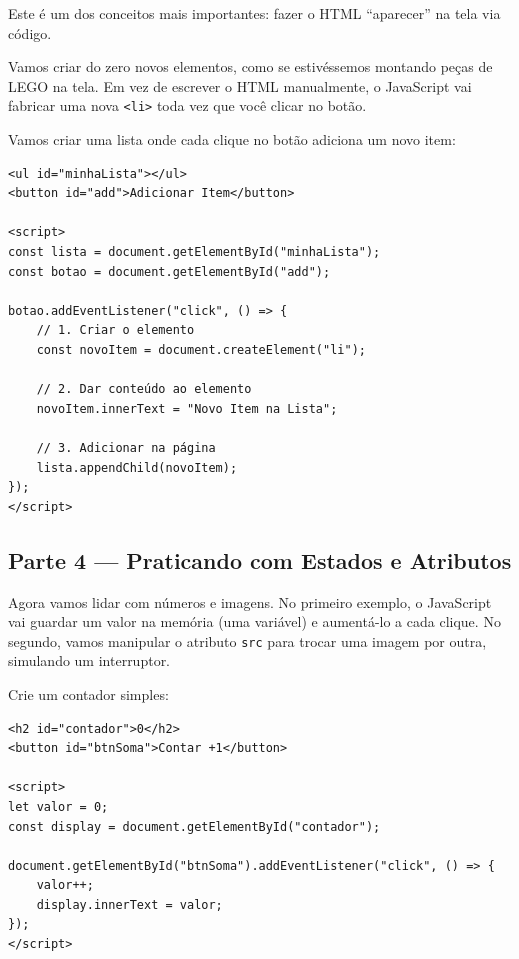 \documentclass[12pt,a4paper]{article}
\begin{document}
Este é um dos conceitos mais importantes: fazer o HTML ``aparecer'' na tela via código.

\begin{boxAtividade}
Vamos criar do zero novos elementos, como se estivéssemos montando peças de LEGO na tela. Em vez de escrever o HTML manualmente, o JavaScript vai fabricar uma nova \texttt{<li>} toda vez que você clicar no botão.
\end{boxAtividade}

\begin{boxAtividade}
Vamos criar uma lista onde cada clique no botão adiciona um novo item:

\begin{boxCodigo}
\begin{verbatim}
<ul id="minhaLista"></ul>
<button id="add">Adicionar Item</button>

<script>
const lista = document.getElementById("minhaLista");
const botao = document.getElementById("add");

botao.addEventListener("click", () => {
    // 1. Criar o elemento
    const novoItem = document.createElement("li");
    
    // 2. Dar conteúdo ao elemento
    novoItem.innerText = "Novo Item na Lista";
    
    // 3. Adicionar na página
    lista.appendChild(novoItem);
});
</script>
\end{verbatim}
\end{boxCodigo}
\end{boxAtividade}

\subsection{Parte 4 — Praticando com Estados e Atributos}

\begin{boxAtividade}
Agora vamos lidar com números e imagens. No primeiro exemplo, o JavaScript vai guardar um valor na memória (uma variável) e aumentá-lo a cada clique. No segundo, vamos manipular o atributo \texttt{src} para trocar uma imagem por outra, simulando um interruptor.
\end{boxAtividade}

\begin{boxAtividade}
Crie um contador simples:

\begin{boxCodigo}
\begin{verbatim}
<h2 id="contador">0</h2>
<button id="btnSoma">Contar +1</button>

<script>
let valor = 0;
const display = document.getElementById("contador");

document.getElementById("btnSoma").addEventListener("click", () => {
    valor++;
    display.innerText = valor;
});
</script>
\end{verbatim}
\end{boxCodigo}
\end{boxAtividade}
\end{document}

